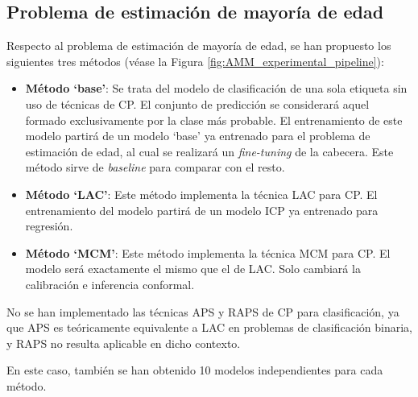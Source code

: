 
\subsection{Problema de estimación de mayoría de edad}

Respecto al problema de estimación de mayoría de edad, se han propuesto los siguientes tres métodos (véase la Figura \ref{fig:AMM_experimental_pipeline}): 

\begin{itemize}

    \item \textbf{Método `base'}: Se trata del modelo de clasificación de una sola etiqueta sin uso de técnicas de \acrshort{CP}. El conjunto de predicción se considerará aquel formado exclusivamente por la clase más probable. El entrenamiento de este modelo partirá de un modelo `base' ya entrenado para el problema de estimación de edad, al cual se realizará un \textit{fine-tuning} de la cabecera. Este método sirve de \textit{baseline} para comparar con el resto. 

    \item \textbf{Método `LAC'}: Este método implementa la técnica \acrshort{LAC} para \acrshort{CP}. El entrenamiento del modelo partirá de un modelo \acrshort{ICP} ya entrenado para regresión.

    \item \textbf{Método `MCM'}: Este método implementa la técnica MCM para CP. El modelo será exactamente el mismo que el de \acrshort{LAC}. Solo cambiará la calibración e inferencia conformal. 

\end{itemize} 

No se han implementado las técnicas \acrshort{APS} y \acrshort{RAPS} de \acrshort{CP} para clasificación, ya que \acrshort{APS} es teóricamente equivalente a \acrshort{LAC} en problemas de clasificación binaria, y \acrshort{RAPS} no resulta aplicable en dicho contexto.

En este caso, también se han obtenido 10 modelos independientes para cada método. 

